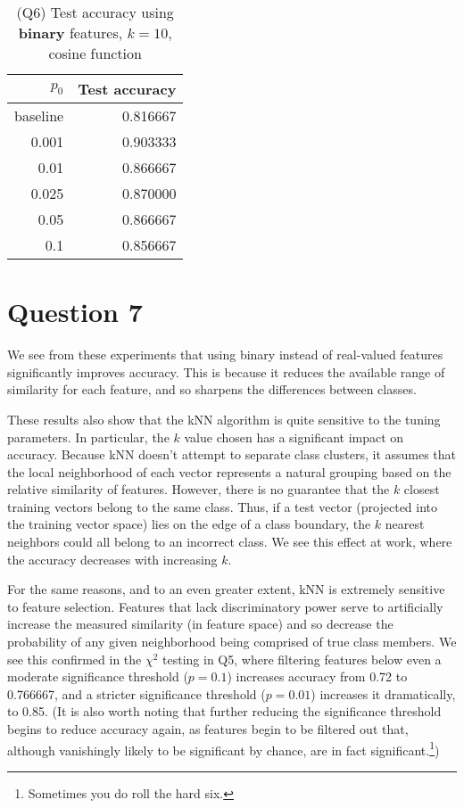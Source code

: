 \documentclass[oneside,justified,marginals=raggedouter]{tufte-handout}
\begin{document}
\begin{table}
\begin{tabular}{@{}rr@{}}
\toprule
$p_0$ & Test accuracy \\ \midrule
baseline & 0.816667 \\
0.001    & 0.903333 \\
0.01     & 0.866667 \\
0.025    & 0.870000 \\
0.05     & 0.866667 \\
0.1      & 0.856667 \\
\bottomrule
\end{tabular}
\caption{(Q6) Test accuracy using {\bf binary} features, {\bf $k=10$},
cosine function}
\end{table}

\section{Question 7}

We see from these experiments that using binary instead of real-valued
features significantly improves accuracy. This is because it reduces the
available range of similarity for each feature, and so sharpens the differences
between classes.

These results also show that the kNN algorithm is quite sensitive to the
tuning parameters. In particular, the $k$ value chosen has a significant
impact on accuracy. Because kNN doesn't attempt to separate class clusters,
it assumes that the local neighborhood of each vector
represents a natural grouping based on the relative
similarity of features. However, there is no guarantee that the $k$ closest
training vectors belong to the same class. Thus, if a test vector (projected
into the training vector space) lies on the edge of a class boundary, the
$k$ nearest neighbors could all belong to an incorrect class. We see this
effect at work, where the accuracy decreases with increasing $k$.

For the same reasons, and to an even greater extent, kNN is extremely
sensitive to feature selection. Features that lack discriminatory power
serve to artificially increase the measured similarity (in feature space) and
so decrease the probability of any given neighborhood being comprised of
true class members. We see this confirmed in the $\chi^2$ testing in Q5, where
filtering features below even a moderate significance threshold ($p=0.1$)
increases accuracy from 0.72 to 0.766667, and a stricter significance threshold ($p=0.01$)
increases it dramatically, to 0.85. (It is also worth noting that further reducing the significance
threshold begins to reduce accuracy again, as features begin to be filtered
out that, although vanishingly likely to be significant by chance, are in fact
significant.\footnote{Sometimes you do roll the hard six.})
\end{document}

